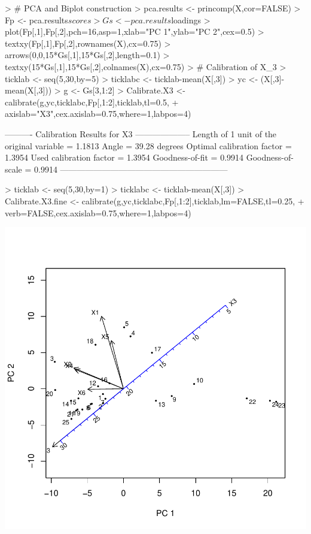 \documentclass[a4paper]{article}
\begin{document}
\begin{Schunk}
\begin{Sinput}
> # PCA and Biplot construction
> pca.results <- princomp(X,cor=FALSE)
> Fp <- pca.results$scores
> Gs <- pca.results$loadings
> plot(Fp[,1],Fp[,2],pch=16,asp=1,xlab="PC 1",ylab="PC 2",cex=0.5)
> textxy(Fp[,1],Fp[,2],rownames(X),cx=0.75)
> arrows(0,0,15*Gs[,1],15*Gs[,2],length=0.1)
> textxy(15*Gs[,1],15*Gs[,2],colnames(X),cx=0.75)
> # Calibration of X_3
> ticklab  <- seq(5,30,by=5)
> ticklabc <- ticklab-mean(X[,3])
> yc <- (X[,3]-mean(X[,3])) 
> g <- Gs[3,1:2]                                  
> Calibrate.X3 <- calibrate(g,yc,ticklabc,Fp[,1:2],ticklab,tl=0.5,
+                           axislab="X3",cex.axislab=0.75,where=1,labpos=4)
\end{Sinput}
\begin{Soutput}
---------- Calibration Results for  X3  --------------------
Length of 1 unit of the original variable =  1.1813  
Angle                                     =  39.28 degrees
Optimal calibration factor                =  1.3954  
Used calibration factor                   =  1.3954  
Goodness-of-fit                           =  0.9914  
Goodness-of-scale                         =  0.9914  
------------------------------------------------------------
\end{Soutput}
\begin{Sinput}
> ticklab  <- seq(5,30,by=1)
> ticklabc <- ticklab-mean(X[,3])
> Calibrate.X3.fine <- calibrate(g,yc,ticklabc,Fp[,1:2],ticklab,lm=FALSE,tl=0.25,
+                                verb=FALSE,cex.axislab=0.75,where=1,labpos=4)
\end{Sinput}
\end{Schunk}
\includegraphics{CalibrationGuide-011}
\end{document}
